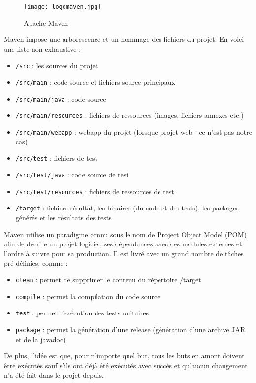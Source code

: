 \documentclass[a4paper,11pt]{article}
\begin{document}
	\begin{figure}[!ht]
		\center
		\texttt{[image: logomaven.jpg]}
		\caption{Apache Maven}
	\end{figure}

Maven impose une arborescence et un nommage des fichiers du projet. En voici une liste non exhaustive :
	\begin{itemize}
		\item \texttt{/src} : les sources du projet
		\item \texttt{/src/main} : code source et fichiers source principaux
		\item \texttt{/src/main/java} : code source
		\item \texttt{/src/main/resources} : fichiers de ressources (images, fichiers annexes etc.)
		\item \texttt{/src/main/webapp} : webapp du projet (lorsque projet web - ce n'est pas notre cas)
		\item \texttt{/src/test} : fichiers de test
		\item \texttt{/src/test/java} : code source de test
		\item \texttt{/src/test/resources} : fichiers de ressources de test
		\item \texttt{/target} : fichiers résultat, les binaires (du code et des tests), les packages générés et les résultats des tests
	\end{itemize}
	
Maven utilise un paradigme connu sous le nom de Project Object Model (POM) afin de décrire un projet logiciel, ses dépendances avec des modules externes et l'ordre à suivre pour sa production. Il est livré avec un grand nombre de tâches pré-définies, comme :
	\begin{itemize}
		\item \texttt{clean} : permet de supprimer le contenu du répertoire /target
		\item \texttt{compile} : permet la compilation du code source
    	\item \texttt{test} : permet l'exécution des tests unitaires
    	\item \texttt{package} : permet la génération d'une release (génération d'une archive JAR et de la javadoc)
	\end{itemize}

De plus, l'idée est que, pour n'importe quel but, tous les buts en amont doivent être exécutés sauf s'ils ont déjà été exécutés avec succès et qu'aucun changement n'a été fait dans le projet depuis.
\end{document}
